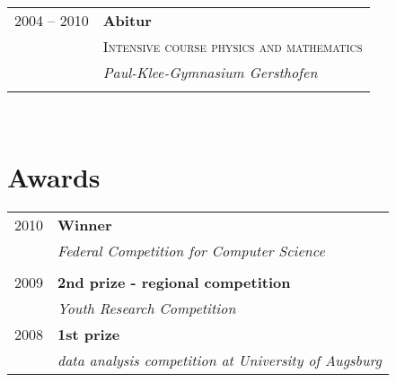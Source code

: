 \documentclass[a4paper,10pt]{article} %
\begin{document}
{\begin{minipage}[t]{0.44\textwidth}
\begin{tabular}{rl}

2004 -- 2010 & \textbf{Abitur}\\
& \textsc{Intensive course physics and mathematics} \\
& \textit{Paul-Klee-Gymnasium Gersthofen}\\
&\\


\end{tabular}\\[10pt]


\section{Awards}

\begin{tabular}{rl}
2010	 & \textbf{Winner}\\
& \textit{Federal Competition for Computer Science}\\ \\


2009	 & \textbf{2nd prize - regional competition}\\
& \textit{Youth Research Competition}\\[10pt]


2008	 & \textbf{1st prize}\\
& \textit{data analysis competition at University of Augsburg}\\[10pt]





\end{tabular}
\end{minipage}}
\end{document}

